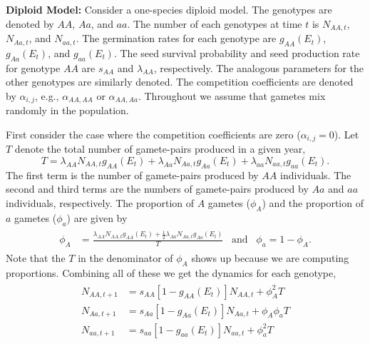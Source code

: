 \documentclass[11pt]{article}
\begin{document}
\noindent \textbf{Diploid Model:} Consider a one-species diploid model.  The genotypes are denoted by $AA$, $Aa$, and $aa$.   The number of each genotypes at time $t$ is $N_{AA,t}$, $N_{Aa,t}$, and $N_{aa,t}$.  The germination rates for each genotype are $g_{AA}(E_t)$, $g_{Aa}(E_t)$, and $g_{aa}(E_t)$.  The seed survival probability and seed production rate for genotype $AA$ are $s_{AA}$ and $\lambda_{AA}$, respectively.  The analogous parameters for the other genotypes are similarly denoted.  The competition coefficients are denoted by $\alpha_{i,j}$, e.g., $\alpha_{AA,AA}$ or $\alpha_{AA,Aa}$.  Throughout we assume that gametes mix randomly in the population.  

First consider the case where the competition coefficients are zero ($\alpha_{i,j}=0$).  Let $T$ denote the total number of gamete-pairs produced in a given year,
\begin{equation}
T = \lambda_{AA}N_{AA,t}g_{AA}(E_t)+ \lambda_{Aa}N_{Aa,t}g_{Aa}(E_t)+\lambda_{aa}N_{aa,t}g_{aa}(E_t).
\end{equation}
The first term is the number of gamete-pairs produced by $AA$ individuals.  The second and third terms are the numbers of gamete-pairs produced by $Aa$ and $aa$ individuals, respectively. The proportion of $A$ gametes ($\phi_A$) and the proportion of $a$ gametes ($\phi_a$) are given by
\begin{align}\begin{split}
\phi_{A} &= \frac{\lambda_{AA}N_{AA,t}g_{AA}(E_t)+ \frac{1}{2}\lambda_{Aa}N_{Aa,t}g_{Aa}(E_t)}{T} \hspace{10pt} \text{and} \hspace{10pt} \phi_a = 1-\phi_{A}.
\end{split}\end{align}
Note that the $T$ in the denominator of $\phi_A$ shows up because we are computing proportions.  Combining all of these we get the dynamics for each genotype,
\begin{align}\begin{split}
N_{AA,t+1} &= s_{AA}[1-g_{AA}(E_t)]N_{AA,t} + \phi_A^2T\\
N_{Aa,t+1} &= s_{Aa}[1-g_{Aa}(E_t)]N_{Aa,t} + \phi_A\phi_aT\\
N_{aa,t+1} &= s_{aa}[1-g_{aa}(E_t)]N_{aa,t} + \phi_a^2T
\end{split}\end{align}
\end{document}
